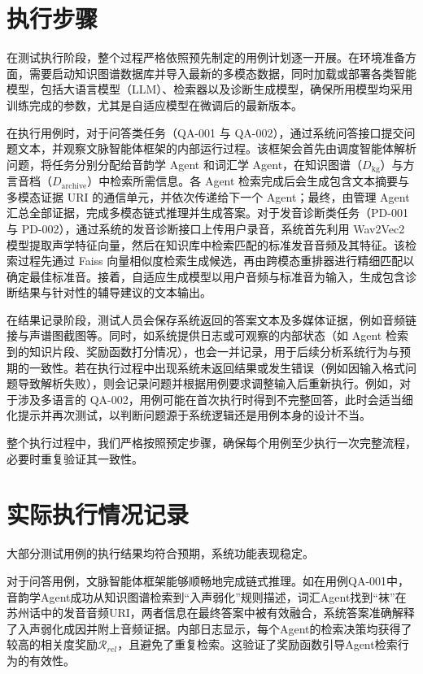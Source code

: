 \section{执行步骤}
在测试执行阶段，整个过程严格依照预先制定的用例计划逐一开展。在环境准备方面，需要启动知识图谱数据库并导入最新的多模态数据，同时加载或部署各类智能模型，包括大语言模型（LLM）、检索器以及诊断生成模型，确保所用模型均采用训练完成的参数，尤其是自适应模型在微调后的最新版本。 
 
在执行用例时，对于问答类任务（QA-001 与 QA-002），通过系统问答接口提交问题文本，并观察文脉智能体框架的内部运行过程。该框架会首先由调度智能体解析问题，将任务分别分配给音韵学 Agent 和词汇学 Agent，在知识图谱（$D_{\mathrm{kg}}$）与方言音档（$D_{\mathrm{archive}}$）中检索所需信息。各 Agent 检索完成后会生成包含文本摘要与多模态证据 URI 的通信单元，并依次传递给下一个 Agent；最终，由管理 Agent 汇总全部证据，完成多模态链式推理并生成答案。对于发音诊断类任务（PD-001 与 PD-002），通过系统的发音诊断接口上传用户录音，系统首先利用 Wav2Vec2 模型提取声学特征向量，然后在知识库中检索匹配的标准发音音频及其特征。该检索过程先通过 Faiss 向量相似度检索生成候选，再由跨模态重排器进行精细匹配以确定最佳标准音。接着，自适应生成模型以用户音频与标准音为输入，生成包含诊断结果与针对性的辅导建议的文本输出。  

在结果记录阶段，测试人员会保存系统返回的答案文本及多媒体证据，例如音频链接与声谱图截图等。同时，如系统提供日志或可观察的内部状态（如 Agent 检索到的知识片段、奖励函数打分情况），也会一并记录，用于后续分析系统行为与预期的一致性。若在执行过程中出现系统未返回结果或发生错误（例如因输入格式问题导致解析失败），则会记录问题并根据用例要求调整输入后重新执行。例如，对于涉及多语言的 QA-002，用例可能在首次执行时得到不完整回答，此时会适当细化提示并再次测试，以判断问题源于系统逻辑还是用例本身的设计不当。

整个执行过程中，我们严格按照预定步骤，确保每个用例至少执行一次完整流程，必要时重复验证其一致性。
\section{实际执行情况记录}
大部分测试用例的执行结果均符合预期，系统功能表现稳定。

对于问答用例，文脉智能体框架能够顺畅地完成链式推理。如在用例QA-001中，音韵学Agent成功从知识图谱检索到“入声弱化”规则描述，词汇Agent找到“袜”在苏州话中的发音音频URI，两者信息在最终答案中被有效融合，系统答案准确解释了入声弱化成因并附上音频证据。内部日志显示，每个Agent的检索决策均获得了较高的相关度奖励$\mathcal{R}_{rel}$，且避免了重复检索。这验证了奖励函数引导Agent检索行为的有效性。

